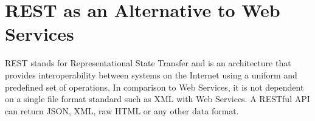 \chapter{REST as an Alternative to Web Services}

REST stands for Representational State Transfer and is an architecture that provides interoperability between systems on the Internet using a uniform and predefined set of operations. In comparison to Web Services, it is not dependent on a single file format standard such as XML with Web Services. A RESTful API can return JSON, XML, raw HTML or any other data format.
